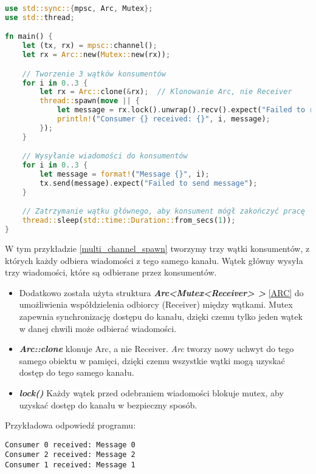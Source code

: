 \begin{lstlisting}[language=Rust, caption=Przykład z wieloma wątkami, label=multi_channel_spawn]
use std::sync::{mpsc, Arc, Mutex};
use std::thread;

fn main() {
    let (tx, rx) = mpsc::channel();
    let rx = Arc::new(Mutex::new(rx));

    // Tworzenie 3 wątków konsumentów
    for i in 0..3 {
        let rx = Arc::clone(&rx);  // Klonowanie Arc, nie Receiver
        thread::spawn(move || {
            let message = rx.lock().unwrap().recv().expect("Failed to receive message");
            println!("Consumer {} received: {}", i, message);
        });
    }

    // Wysyłanie wiadomości do konsumentów
    for i in 0..3 {
        let message = format!("Message {}", i);
        tx.send(message).expect("Failed to send message");
    }

    // Zatrzymanie wątku głównego, aby konsument mógł zakończyć pracę
    thread::sleep(std::time::Duration::from_secs(1));
}

\end{lstlisting}
W tym przykładzie \ref{multi_channel_spawn} tworzymy trzy wątki konsumentów, z których każdy odbiera wiadomości z tego samego kanału. Wątek główny wysyła trzy wiadomości, które są odbierane przez konsumentów.
\begin{itemize}
    \item Dodatkowo została użyta struktura \textbf{\textit{Arc<Mutex<Receiver> >}} \ref{ARC} do umożliwienia współdzielenia odbiorcy (Receiver) między wątkami. Mutex zapewnia synchronizację dostępu do kanału, dzięki czemu tylko jeden wątek w danej chwili może odbierać wiadomości.
    \item \textbf{\textit{Arc::clone}} klonuje Arc, a nie Receiver. \textit{Arc} tworzy nowy uchwyt do tego samego obiektu w pamięci, dzięki czemu wszystkie wątki mogą uzyskać dostęp do tego samego kanału.
    \item \textbf{\textit{lock()}} Każdy wątek przed odebraniem wiadomości blokuje mutex, aby uzyskać dostęp do kanału w bezpieczny sposób.
\end{itemize}
Przykładowa odpowiedź programu:
\begin{verbatim}
Consumer 0 received: Message 0
Consumer 2 received: Message 2
Consumer 1 received: Message 1
\end{verbatim}

